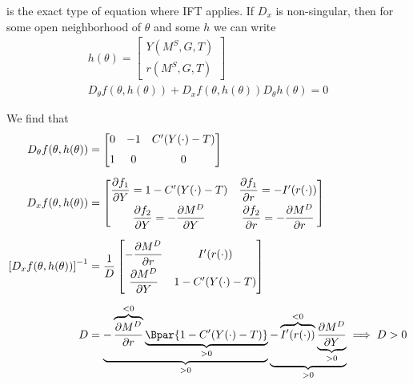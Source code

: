 \documentclass{article}
\begin{document}
\begin{enumerate}[1.]
\begin{enumerate}[a)]
          is the exact type of equation where IFT applies. If $D_x$ is non-singular, then for some open neighborhood of $\theta$ and some $h$ we can write
          \begin{equation}
            \begin{array}{c}
              h(\theta)
              = \left[\begin{matrix}
                Y(M^S, G, T) \\
                r(M^S, G, T)
              \end{matrix}\right] \\[6pt]
              D_\theta f(\theta, h(\theta)) + D_x f(\theta, h(\theta)) D_\theta h(\theta) = 0
            \end{array}
            \label{eq:ift_example_statement}
          \end{equation}

          We find that
          \begin{align*}
            D_\theta f(\theta, h(\theta))
            & =
            \left[\begin{matrix}
                0
              & -1
              & C^\prime(Y(\cdot) - T) \\[6pt]
                1
              & 0
              & 0
            \end{matrix}\right] \\[6pt]
            D_x f(\theta, h(\theta))
            & =
            \left[\begin{matrix}
                \dfrac{\partial f_1}{\partial Y} = 1 - C^\prime(Y(\cdot) - T)
              & \dfrac{\partial f_1}{\partial r} = -I^\prime(r(\cdot)) \\[6pt]
                \dfrac{\partial f_2}{\partial Y} = -\dfrac{\partial M^D}{\partial Y}
              & \dfrac{\partial f_2}{\partial r} = -\dfrac{\partial M^D}{\partial r}
            \end{matrix}\right] \\[6pt]
            \left[D_x f(\theta, h(\theta))\right]^{-1}
            & =
            \dfrac{1}{D}
            \left[\begin{matrix}
                - \dfrac{\partial M^D}{\partial r}
              & I^\prime(r(\cdot)) \\[6pt]
                \dfrac{\partial M^D}{\partial Y}
              & 1 - C^\prime(Y(\cdot) - T)
            \end{matrix}\right] \\[6pt]
            D & =
            \underbrace{
             - \overbrace{\dfrac{\partial M^D}{\partial r}}^{< 0}
               \underbrace{\Bpar{1 - C^\prime(Y(\cdot) - T)}}_{> 0}
             }_{> 0}
            \underbrace{
             - \overbrace{I^\prime(r(\cdot))}^{< 0}
               \underbrace{\dfrac{\partial M^D}{\partial Y}}_{> 0}
             }_{> 0}
             \implies D > 0
          \end{align*}


\end{enumerate}
\end{enumerate}
\end{document}
